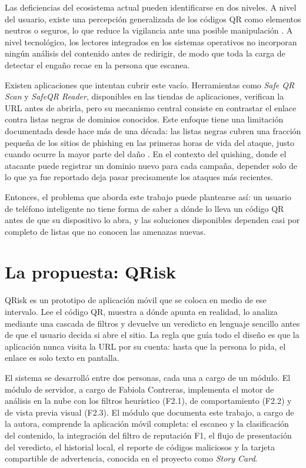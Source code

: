 Las deficiencias del ecosistema actual pueden identificarse en dos niveles. A nivel del usuario, existe una percepción generalizada de los códigos QR como elementos neutros o seguros, lo que reduce la vigilancia ante una posible manipulación \cite{krombholz2014qr}. A nivel tecnológico, los lectores integrados en los sistemas operativos no incorporan ningún análisis del contenido antes de redirigir, de modo que toda la carga de detectar el engaño recae en la persona que escanea.

Existen aplicaciones que intentan cubrir este vacío. Herramientas como \emph{Safe QR Scan} y \emph{SafeQR Reader}, disponibles en las tiendas de aplicaciones, verifican la URL antes de abrirla, pero su mecanismo central consiste en contrastar el enlace contra listas negras de dominios conocidos. Este enfoque tiene una limitación documentada desde hace más de una década: las listas negras cubren una fracción pequeña de los sitios de phishing en las primeras horas de vida del ataque, justo cuando ocurre la mayor parte del daño \cite{sheng2009empirical}. En el contexto del quishing, donde el atacante puede registrar un dominio nuevo para cada campaña, depender solo de lo que ya fue reportado deja pasar precisamente los ataques más recientes.

Entonces, el problema que aborda este trabajo puede plantearse así: un usuario de teléfono inteligente no tiene forma de saber a dónde lo lleva un código QR antes de que su dispositivo lo abra, y las soluciones disponibles dependen casi por completo de listas que no conocen las amenazas nuevas.

\section{La propuesta: QRisk}

QRisk es un prototipo de aplicación móvil que se coloca en medio de ese intervalo. Lee el código QR, muestra a dónde apunta en realidad, lo analiza mediante una cascada de filtros y devuelve un veredicto en lenguaje sencillo antes de que el usuario decida si abre el sitio. La regla que guía todo el diseño es que la aplicación nunca visita la URL por su cuenta: hasta que la persona lo pida, el enlace es solo texto en pantalla.

El sistema se desarrolló entre dos personas, cada una a cargo de un módulo. El módulo de servidor, a cargo de Fabiola Contreras, implementa el motor de análisis en la nube con los filtros heurístico (F2.1), de comportamiento (F2.2) y de vista previa visual (F2.3). El módulo que documenta este trabajo, a cargo de la autora, comprende la aplicación móvil completa: el escaneo y la clasificación del contenido, la integración del filtro de reputación F1, el flujo de presentación del veredicto, el historial local, el reporte de códigos maliciosos y la tarjeta compartible de advertencia, conocida en el proyecto como \emph{Story Card}.

